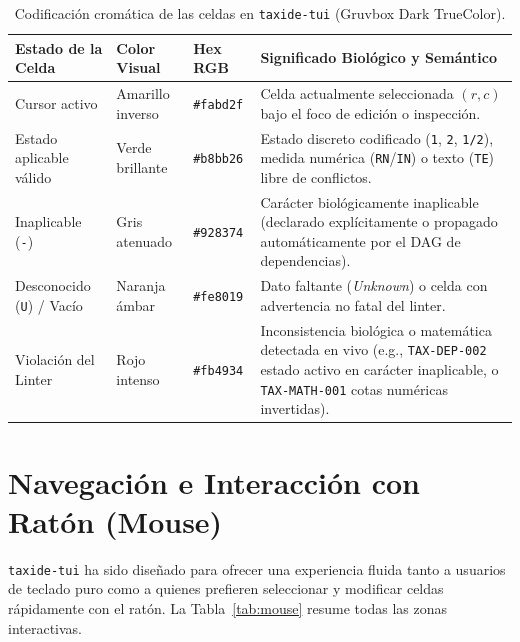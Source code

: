 \documentclass[11pt,a4paper]{article}
\begin{document}
\begin{table}[ht]
\centering
\small
\caption{Codificación cromática de las celdas en \texttt{taxide-tui} (Gruvbox Dark TrueColor).}
\label{tab:colores}
\begin{tabularx}{\textwidth}{@{}l l l X@{}}
\toprule
\textbf{Estado de la Celda} & \textbf{Color Visual} & \textbf{Hex RGB} & \textbf{Significado Biológico y Semántico} \\
\midrule
Cursor activo & Amarillo inverso & \texttt{\#fabd2f} & Celda actualmente seleccionada $(r, c)$ bajo el foco de edición o inspección. \\
Estado aplicable válido & Verde brillante & \texttt{\#b8bb26} & Estado discreto codificado (\texttt{1}, \texttt{2}, \texttt{1/2}), medida numérica (\texttt{RN}/\texttt{IN}) o texto (\texttt{TE}) libre de conflictos. \\
Inaplicable (\texttt{-}) & Gris atenuado & \texttt{\#928374} & Carácter biológicamente inaplicable (declarado explícitamente o propagado automáticamente por el DAG de dependencias). \\
Desconocido (\texttt{U}) / Vacío & Naranja ámbar & \texttt{\#fe8019} & Dato faltante (\textit{Unknown}) o celda con advertencia no fatal del linter. \\
Violación del Linter & Rojo intenso & \texttt{\#fb4934} & Inconsistencia biológica o matemática detectada en vivo (e.g., \texttt{TAX-DEP-002} estado activo en carácter inaplicable, o \texttt{TAX-MATH-001} cotas numéricas invertidas). \\
\bottomrule
\end{tabularx}
\end{table}

\section{Navegación e Interacción con Ratón (Mouse)}
\label{sec:raton}

\texttt{taxide-tui} ha sido diseñado para ofrecer una experiencia fluida tanto a usuarios de teclado puro como a quienes prefieren seleccionar y modificar celdas rápidamente con el ratón. La Tabla~\ref{tab:mouse} resume todas las zonas interactivas.
\end{document}
